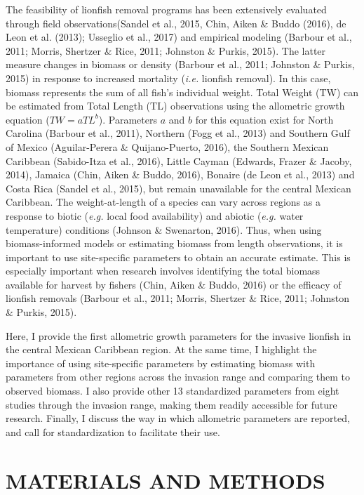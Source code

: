 \documentclass[12pt,]{article}
\begin{document}
The feasibility of lionfish removal programs has been extensively
evaluated through field observations(Sandel et al., 2015, Chin, Aiken \&
Buddo (2016), de Leon et al. (2013); Usseglio et al., 2017) and
empirical modeling (Barbour et al., 2011; Morris, Shertzer \& Rice,
2011; Johnston \& Purkis, 2015). The latter measure changes in biomass
or density (Barbour et al., 2011; Johnston \& Purkis, 2015) in response
to increased mortality (\emph{i.e.} lionfish removal). In this case,
biomass represents the sum of all fish's individual weight. Total Weight
(TW) can be estimated from Total Length (TL) observations using the
allometric growth equation (\(TW = aTL^b\)). Parameters \(a\) and \(b\)
for this equation exist for North Carolina (Barbour et al., 2011),
Northern (Fogg et al., 2013) and Southern Gulf of Mexico (Aguilar-Perera
\& Quijano-Puerto, 2016), the Southern Mexican Caribbean (Sabido-Itza et
al., 2016), Little Cayman (Edwards, Frazer \& Jacoby, 2014), Jamaica
(Chin, Aiken \& Buddo, 2016), Bonaire (de Leon et al., 2013) and Costa
Rica (Sandel et al., 2015), but remain unavailable for the central
Mexican Caribbean. The weight-at-length of a species can vary across
regions as a response to biotic (\emph{e.g.} local food availability)
and abiotic (\emph{e.g.} water temperature) conditions (Johnson \&
Swenarton, 2016). Thus, when using biomass-informed models or estimating
biomass from length observations, it is important to use site-specific
parameters to obtain an accurate estimate. This is especially important
when research involves identifying the total biomass available for
harvest by fishers (Chin, Aiken \& Buddo, 2016) or the efficacy of
lionfish removals (Barbour et al., 2011; Morris, Shertzer \& Rice, 2011;
Johnston \& Purkis, 2015).

Here, I provide the first allometric growth parameters for the invasive
lionfish in the central Mexican Caribbean region. At the same time, I
highlight the importance of using site-specific parameters by estimating
biomass with parameters from other regions across the invasion range and
comparing them to observed biomass. I also provide other 13 standardized
parameters from eight studies through the invasion range, making them
readily accessible for future research. Finally, I discuss the way in
which allometric parameters are reported, and call for standardization
to facilitate their use.

\clearpage

\section{MATERIALS AND METHODS}\label{materials-and-methods}
\end{document}
